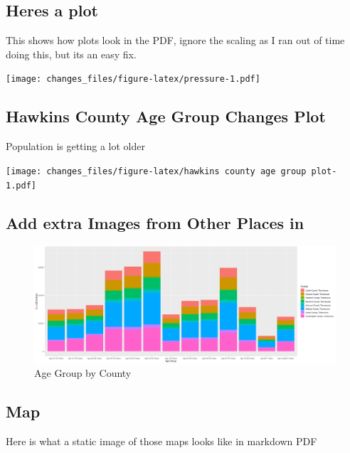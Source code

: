 \documentclass[
]{article}
\begin{document}
\hypertarget{heres-a-plot}{%
\subsection{Heres a plot}\label{heres-a-plot}}

This shows how plots look in the PDF, ignore the scaling as I ran out of
time doing this, but its an easy fix.

\texttt{[image: changes\_files/figure-latex/pressure-1.pdf]}

\hypertarget{hawkins-county-age-group-changes-plot}{%
\subsection{Hawkins County Age Group Changes
Plot}\label{hawkins-county-age-group-changes-plot}}

Population is getting a lot older

\texttt{[image: changes\_files/figure-latex/hawkins county age group plot-1.pdf]}

\hypertarget{add-extra-images-from-other-places-in}{%
\subsection{Add extra Images from Other Places
in}\label{add-extra-images-from-other-places-in}}

\begin{figure}
\includegraphics[width=1\linewidth]{age_group_plots} \caption{Age Group by County}\label{fig:age group by county}
\end{figure}

\hypertarget{map}{%
\subsection{Map}\label{map}}

Here is what a static image of those maps looks like in markdown PDF
\end{document}
